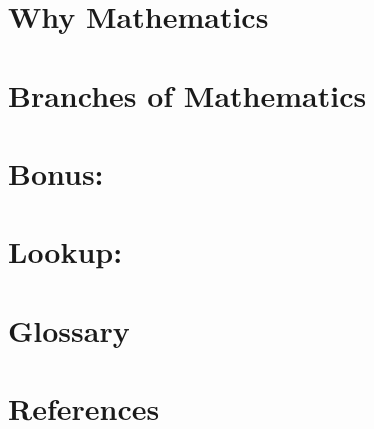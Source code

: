 \section{Why Mathematics}
\section{Branches of Mathematics}

\section{Bonus: }%
\section{Lookup: }%
\section{Glossary}
\section{References}

\newpage
